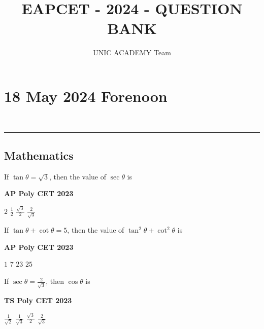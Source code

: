 \documentclass[11pt,paper=a4,answers]{exam}
\begin{document}
\title{EAPCET - 2024 - QUESTION BANK}
\author{UNIC ACADEMY Team}
\maketitle
\newpage

\section*{18 May 2024 Forenoon}
\noindent \\
\rule{\textwidth}{1.4pt}

\subsection*{Mathematics}
\begin{multicols}{2}
\begin{questions}
\question
If $\tan  \theta = \sqrt{3}$, then the value of $\sec \theta$ is
\begin{flushright}
\small\textbf{AP Poly CET 2023}
\end{flushright}


\begin{choices}
\choice $\displaystyle 2$ 
\choice $\displaystyle \frac{1}{2}$ 
\choice $\displaystyle \frac{\sqrt{3}}{2}$ 
\choice $\displaystyle \frac{2}{\sqrt{3}}$  
\end{choices}






\question If $\tan  \theta + \cot \theta = 5$, then the value of $\tan^2  \theta + \cot^2 \theta $ is
\begin{flushright}
\small\textbf{AP Poly CET 2023}
\end{flushright}

\begin{choices}
\choice $\displaystyle 1$ 
\choice $\displaystyle 7$ 
\choice $\displaystyle 23$ 
\choice $\displaystyle 25$  
\end{choices}
\question If $\displaystyle \sec  \theta = \frac{2}{\sqrt{3}}$, then $\cos \theta$ is
\begin{flushright}
\small\textbf{TS Poly CET 2023}
\end{flushright}


\begin{choices}
\choice $\displaystyle \frac{1}{\sqrt{2}}$ 
\choice $\displaystyle \frac{1}{\sqrt{3}}$ 
\choice $\displaystyle \frac{\sqrt{3}}{2}$ 
\choice $\displaystyle \frac{2}{\sqrt{3}}$   
\end{choices}



\end{questions}
\end{multicols}
\end{document}
